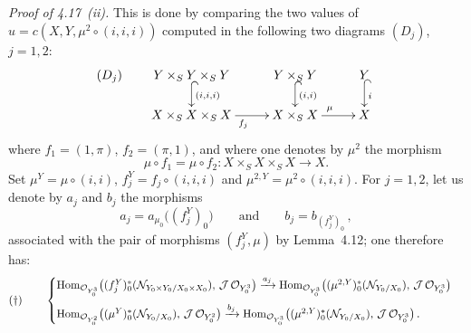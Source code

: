 \label{III.4.19}
{\itshape Proof of 4.17~(ii).}
This is done by comparing the two values of
\(u=c(X,Y,\mu^{2}\circ(i,i,i))\) computed in the following two diagrams
\((D_{j})\), \(j=1,2\):
\[
(D_{j})\qquad
\xymatrix@C=2.6em@R=1.7em{
Y\times_{S}Y\times_{S}Y
  \ar@{^{(}->}[d]^{{(i,i,i)}}
&
Y\times_{S}Y
  \ar@{^{(}->}[d]^{{(i,i)}}
&
Y
  \ar@{^{(}->}[d]^{i}
\\
X\times_{S}X\times_{S}X
  \ar[r]_{f_{j}}
&
X\times_{S}X
  \ar[r]^{\mu}
&
X
}
\]
where \(f_{1}=(1,\pi)\), \(f_{2}=(\pi,1)\), and where one denotes by \(\mu^{2}\)
the morphism
\[
\mu\circ f_{1}=\mu\circ f_{2}\colon
X\times_{S}X\times_{S}X\longrightarrow X.
\]
{\renewcommand{\thefootnote}{(111)}}
Set \(\mu^{Y}=\mu\circ(i,i)\), \(f_{j}^{Y}=f_{j}\circ(i,i,i)\) and
\(\mu^{2,Y}=\mu^{2}\circ(i,i,i)\). For \(j=1,2\), let us denote by \(a_{j}\)
and \(b_{j}\) the morphisms
\[
a_{j}=a_{\mu_{0}}\bigl((f_{j}^{Y})_{0}\bigr)
\qquad\text{and}\qquad
b_{j}=b_{(f_{j}^{Y})_{0}}\,,
\]
associated with the pair of morphisms \((f_{j}^{Y},\mu)\) by Lemma~4.12; one
therefore has:
\[
(\dagger)\qquad
\begin{cases}
\operatorname{Hom}_{\mathcal{O}_{Y_{0}^{3}}}\bigl(
  (f_{j}^{Y})_{0}^{*}(\mathcal{N}_{Y_{0}\times Y_{0}/X_{0}\times X_{0}}),\,
  \mathcal{J}\,\mathcal{O}_{Y_{0}^{3}}\bigr)
\xrightarrow{a_{j}}
\operatorname{Hom}_{\mathcal{O}_{Y_{0}^{3}}}\bigl(
  (\mu^{2,Y})_{0}^{*}(\mathcal{N}_{Y_{0}/X_{0}}),\,
  \mathcal{J}\,\mathcal{O}_{Y_{0}^{3}}\bigr)
\\[0.9em]
\operatorname{Hom}_{\mathcal{O}_{Y_{0}^{2}}}\bigl(
  (\mu^{Y})_{0}^{*}(\mathcal{N}_{Y_{0}/X_{0}}),\,
  \mathcal{J}\,\mathcal{O}_{Y_{0}^{2}}\bigr)
\xrightarrow{b_{j}}
\operatorname{Hom}_{\mathcal{O}_{Y_{0}^{3}}}\bigl(
  (\mu^{2,Y})_{0}^{*}(\mathcal{N}_{Y_{0}/X_{0}}),\,
  \mathcal{J}\,\mathcal{O}_{Y_{0}^{3}}\bigr)\,.
\end{cases}
\]

